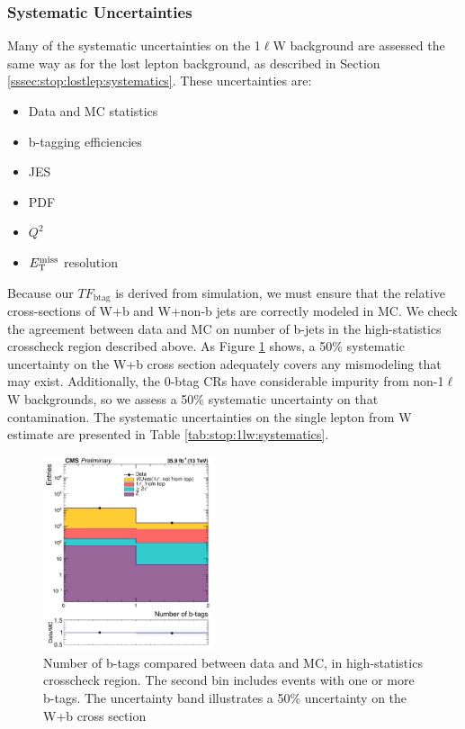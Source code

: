 \subsubsection{Systematic Uncertainties}
\label{sssec:stop:1lw:systematics}

Many of the systematic uncertainties on the 1$\ell$W background are
assessed the same way as for the lost lepton background, as described
in Section \ref{sssec:stop:lostlep:systematics}. These uncertainties
are:
\begin{itemize}
\item Data and MC statistics
\item b-tagging efficiencies
\item JES
\item PDF
\item $Q^2$
\item $E_\text{T}^\text{miss}$ resolution
\end{itemize}

Because our $TF_\text{btag}$ is derived from simulation, we must ensure that
the relative cross-sections of W+b and W+non-b jets are correctly
modeled in MC. We check the agreement between data and MC on number of
b-jets in the high-statistics crosscheck region described above. As
Figure \ref{fig:stop:1lw:wb} shows, a 50\% systematic uncertainty on
the W+b cross section adequately covers any mismodeling that may
exist. Additionally, the 0-btag CRs have considerable impurity from
non-1$\ell$W backgrounds, so we assess a 50\% systematic uncertainty on
that contamination. The systematic uncertainties on the single lepton
from W estimate are presented in Table \ref{tab:stop:1lw:systematics}.

\begin{figure}[htb]
\centering
\includegraphics[width=0.45\textwidth]{Figures/cr0b_nbtags_crosscheck.pdf}
\caption{Number of b-tags compared between data and MC, in
  high-statistics crosscheck region. The second bin includes events
  with one or more b-tags. The uncertainty band illustrates a 50\%
  uncertainty on the W+b cross section}
\label{fig:stop:1lw:wb}
\end{figure}

